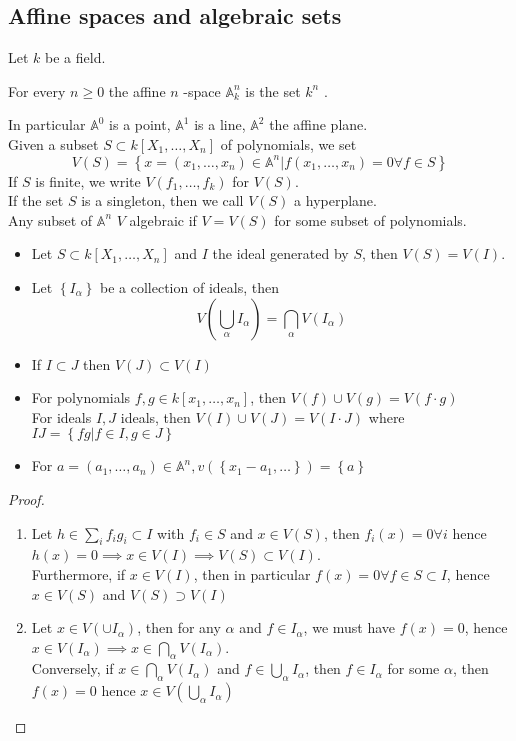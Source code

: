 \documentclass[../main.tex]{subfiles}
\begin{document}
\subsection{Affine spaces and algebraic sets}
Let $k$ be a field.
\begin{defn}
	For every $n \geq 0$ the affine $n$ -space $ \mathbb{A}_k^{n}$ is the set $k^{n}$ .	
\end{defn}
In particular $ \mathbb{A}^{0}$ is a point, $ \mathbb{A}^{1}$ is a line, $ \mathbb{A}^{2}$ the affine plane.\\
Given a subset $ S \subset k [ X_1,\ldots, X_n] $ of polynomials, we set
\[ 
V( S) = \left\{ x= ( x_1, \ldots, x_n) \in \mathbb{A}^{n}| f( x_1,\ldots, x_n)=0 \forall f \in S  \right\} 
\]
If $S$ is finite, we write $V(  f_1,\ldots, f_k) $ for $V( S) $.\\
If the set $S$ is a singleton, then we call $V( S) $ a hyperplane.\\
Any subset of $ \mathbb{A}^{n}$  $V$ algebraic if $V=V( S) $ for some subset of polynomials.
\begin{lemma}
	\begin{itemize}
	\item 
	Let $S \subset k[X_1,\ldots, X_n]$ and $I$ the ideal generated by $S$, then $V( S) = V( I) $.

\item Let $ \left\{ I_\alpha \right\} $ be a collection of ideals, then 
	\[ 
	V( \bigcup_\alpha I_\alpha) = \bigcap_{\alpha} V( I_\alpha) 
	\]
	
\item If $I \subset J$ then $V( J) \subset V( I) $ 
\item For polynomials $f,g \in k[x_1,\ldots, x_n]$, then $V( f) \cup V( g) = V( f\cdot g) $ \\
For ideals $I,J$ ideals, then $V( I) \cup V( J) = V( I\cdot J) $ where $IJ = \left\{ fg | f\in I , g\in J \right\} $ 
\item For $a= ( a_1,\ldots, a_n) \in \mathbb{A}^{n}, v( \left\{ x_1-a_1,\ldots \right\} ) = \left\{ a \right\} 	$
	\end{itemize}
\end{lemma}
\begin{proof}
\begin{enumerate}
\item Let $h \in \sum_i f_i g_i \subset I $ with $f_i \in S$ and $x\in V( S) $, then $f_i( x) =0\forall i$ hence $h(x)=0 \implies x\in V( I) 	\implies V( S) \subset V( I) 	 $.\\
	Furthermore, if $x\in V( I) $, then in particular $f( x) = 0 \forall f \in S \subset I$, hence $x \in V( S) $ and $V( S) \supset V( I) $ 
\item Let $x\in V( \cup I_\alpha) $, then for any $\alpha$ and $f\in I_\alpha$, we must have $f( x) =0$, hence $x\in V( I_\alpha) \implies x\in \bigcap_{\alpha} V( I_\alpha) $.\\
	Conversely, if $x\in \bigcap_{\alpha} V( I_\alpha) $ and $f\in \bigcup_{\alpha} I_\alpha$, then $f\in I_\alpha$ for some $\alpha$, then $f( x) =0$ hence $x\in V( \bigcup_\alpha I_\alpha) $ 
\end{enumerate}

\end{proof}
\end{document}
